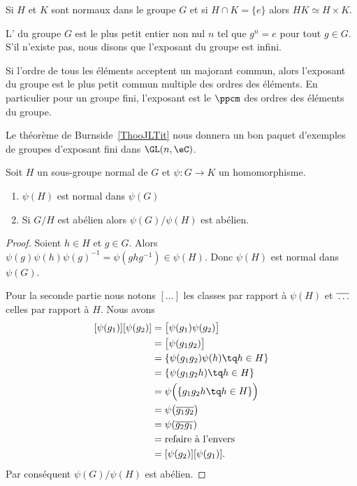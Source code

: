 \begin{lemma}\label{LemHUkMxp}
    Si \( H\) et \( K\) sont normaux dans le groupe \( G\) et si \( H\cap K=\{ e \}\) alors \( HK\simeq H\times K\).
\end{lemma}

\begin{definition}  \label{DefvtSAyb}
    L' du groupe \( G\) est le plus petit entier non nul \( n\) tel que \( g^n=e\) pour tout \( g\in G\). S'il n'existe pas, nous disons que l'exposant du groupe est infini.
\end{definition}
Si l'ordre de tous les éléments acceptent un majorant commun, alors l'exposant du groupe est le plus petit commun multiple des ordres des éléments. En particulier pour un groupe fini, l'exposant est le $\ppcm$ des ordres des éléments du groupe.

Le théorème de Burnside~\ref{ThooJLTit} nous donnera un bon paquet d'exemples de groupes d'exposant fini dans \( \GL(n,\eC)\).

\begin{proposition} \label{PropSRMJooIDPBoW}
    Soit \( H\) un sous-groupe normal de \( G\) et \( \psi\colon G\to K\) un homomorphisme.
    \begin{enumerate}
        \item
            \( \psi(H)\) est normal dans \( \psi(G)\)
        \item
            Si \( G/H\) est abélien alors \( \psi(G)/\psi(H)\) est abélien.
    \end{enumerate}
\end{proposition}

\begin{proof}
    Soient \( h\in H\) et \( g\in G\). Alors \( \psi(g)\psi(h)\psi(g)^{-1}=\psi(ghg^{-1})\in\psi(H)\). Donc \( \psi(H)\) est normal dans \( \psi(G)\).

    Pour la seconde partie nous notons \( [\ldots]\) les classes par rapport à \( \psi(H)\) et \( \overline{ \vphantom{g}\ldots }\) celles par rapport à \( H\). Nous avons
    \begin{subequations}
        \begin{align}
            [\psi(g_1)][\psi(g_2)]&=\big[ \psi(g_1)\psi(g_2) \big]\\
            &=\big[ \psi(g_1g_2) \big]\\
            &=\{ \psi(g_1g_2)\psi(h)\tq h\in H \}\\
            &=\{ \psi(g_1g_2h)\tq h\in H \}\\
            &=\psi\Big(  \{ g_1g_2h\tq h\in H \}  \Big) \\
            &=\psi\big( \overline{ g_1g_2 } \big)\\
            &=\psi(\overline{ g_2g_1 })\\
            &=\text{refaire à l'envers}\\
            &=[\psi(g_2)][\psi(g_1)].
        \end{align}
    \end{subequations}
    Par conséquent \( \psi(G)/\psi(H)\) est abélien.
\end{proof}

